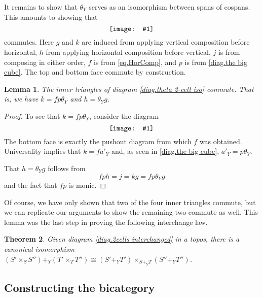\documentclass[11pt]{amsart}
\newcommand{\diagram}[1]{\raisebox{-0.5\height}{\texttt{[image: \#1]}}}
\newtheorem{thm}{Theorem}[section]
\newtheorem{lem}[thm]{Lemma}
\theoremstyle{remark}
\theoremstyle{definition}
\begin{document}
It remains to show that $\theta_Y$ serves as 
an isomorphism between spans of cospans. This 
amounts to showing that
%
\begin{equation} 
	\label{diag.theta 2-cell iso}
	\diagram{Diag_Theta2CellIso}
\end{equation}
%
commutes. Here $g$ and $k$ are induced from applying vertical composition before horizontal, $h$ from applying horizontal composition before vertical, $j$ is from composing in either order, $f$ is from \eqref{eq.HorComp}, and $p$ is from \eqref{diag.the big cube}.  The top and bottom face commute by construction.
%
%
%
%
%
%

\begin{lem}
	The inner triangles of diagram \eqref{diag.theta 2-cell iso} commute. That is, we have $k=fp \theta_Y$ and $h=\theta_Yg$.
\end{lem}
%
\begin{proof}
	To see that $k=fp\theta_Y$, consider the diagram
	\[
		\label{NoRef_2CellIso}
		\diagram{NoRef_2CellIso}
	\]
	The bottom face is exactly the pushout diagram from which $f$ was obtained.  Universality implies that $k = f a'_Y$ and, as seen in \eqref{diag.the big cube}, $a'_Y = p \theta_Y$. 
	
	That $h=\theta_Yg$ follows from 
	\[
		fph=j=kg=fp\theta_Yg
	\] 
	and the fact that $fp$ is monic.
\end{proof}


%
%
%
%
%

Of course, we have only shown that two of the four inner triangles commute, but we can replicate our arguments to show the remaining two commute as well.  This lemma was the last step in proving the following interchange law.

\begin{thm}
	\label{thm.interchange law}
	Given diagram \eqref{diag.2cells interchanged} in a topos, there is a canonical isomorphism $(S' \times_S S'') +_Y (T' \times_T T'') \cong (S' +_Y T') \times_{S +_Y T} ( S'' +_Y T'')$.
\end{thm}

%
%
%
%
%
%
\subsection{Constructing the bicategory}  %
%
%
%
%
%
%
%
\end{document}
